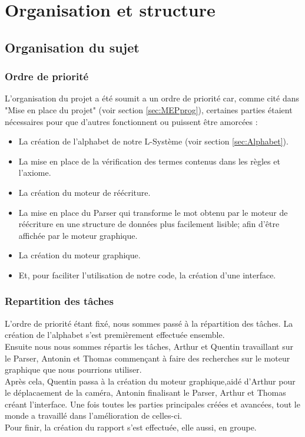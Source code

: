 \chapter{Organisation et structure}

\section{Organisation du sujet}

\subsection{Ordre de priorité}
L'organisation du projet a été soumit a un ordre de priorité car, comme cité dans "Mise en place du projet" (voir section \ref{sec:MEPprog}), certaines parties étaient nécessaires pour que d'autres fonctionnent ou puissent être amorcées :
\begin{itemize}
    \item La création de l'alphabet de notre L-Système (voir section \ref{sec:Alphabet}).
    \item La mise en place de la vérification des termes contenus dans les règles et l'axiome.
    \item La création du moteur de réécriture.
    \item La mise en place du Parser qui transforme le mot obtenu par le moteur de réécriture en une structure de données plus facilement lisible; afin d'être affichée par le moteur graphique.
    \item La création du moteur graphique.
    \item Et, pour faciliter l'utilisation de notre code, la création d'une interface.
\end{itemize}

\subsection{Repartition des tâches}
L'ordre de priorité étant fixé, nous sommes passé à la répartition des tâches. La création de l'alphabet s'est premièrement effectuée ensemble.
\\
Ensuite nous nous sommes répartis les tâches, Arthur et Quentin travaillant sur le Parser, Antonin et Thomas commençant à faire des recherches sur le moteur graphique que nous pourrions utiliser.
\\
Après cela, Quentin passa à la création du moteur graphique,aidé d'Arthur pour le déplacaement de la caméra, Antonin finalisant le Parser, Arthur et Thomas créant l'interface. Une fois toutes les parties principales créées et avancées, tout le monde a travaillé dans l'amélioration de celles-ci.
\\
Pour finir, la création du rapport s'est effectuée, elle aussi, en groupe.

